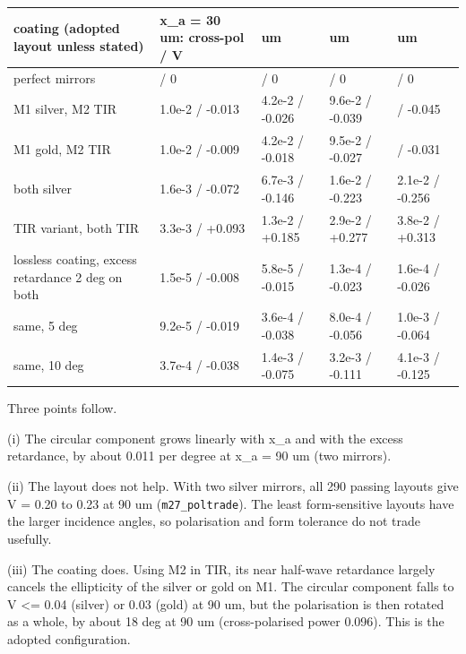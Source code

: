 {\small
\begin{longtable}[]{@{}>{\raggedright\arraybackslash}p{0.395\dimexpr(\linewidth-10\tabcolsep)\relax}>{\raggedright\arraybackslash}p{0.218\dimexpr(\linewidth-10\tabcolsep)\relax}>{\raggedright\arraybackslash}p{0.129\dimexpr(\linewidth-10\tabcolsep)\relax}>{\raggedright\arraybackslash}p{0.129\dimexpr(\linewidth-10\tabcolsep)\relax}>{\raggedright\arraybackslash}p{0.129\dimexpr(\linewidth-10\tabcolsep)\relax}@{}}
\toprule\noalign{}
coating (adopted layout unless stated) & x\_a = 30 um: cross-pol / V &
60 um & 90 um & 102 um \\
\midrule\noalign{}
\endhead
\bottomrule\noalign{}
\endlastfoot
perfect mirrors & 0 / 0 & 0 / 0 & 0 / 0 & 0 / 0 \\
M1 silver, M2 TIR & 1.0e-2 / -0.013 & 4.2e-2 / -0.026 & 9.6e-2 / -0.039
& 0.12 / -0.045 \\
M1 gold, M2 TIR & 1.0e-2 / -0.009 & 4.2e-2 / -0.018 & 9.5e-2 / -0.027 &
0.12 / -0.031 \\
both silver & 1.6e-3 / -0.072 & 6.7e-3 / -0.146 & 1.6e-2 / -0.223 &
2.1e-2 / -0.256 \\
TIR variant, both TIR & 3.3e-3 / +0.093 & 1.3e-2 / +0.185 & 2.9e-2 /
+0.277 & 3.8e-2 / +0.313 \\
lossless coating, excess retardance 2 deg on both & 1.5e-5 / -0.008 &
5.8e-5 / -0.015 & 1.3e-4 / -0.023 & 1.6e-4 / -0.026 \\
same, 5 deg & 9.2e-5 / -0.019 & 3.6e-4 / -0.038 & 8.0e-4 / -0.056 &
1.0e-3 / -0.064 \\
same, 10 deg & 3.7e-4 / -0.038 & 1.4e-3 / -0.075 & 3.2e-3 / -0.111 &
4.1e-3 / -0.125 \\
\end{longtable}
}

Three points follow.

(i) The circular component grows linearly with x\_a and with the excess
retardance, by about 0.011 per degree at x\_a = 90 um (two mirrors).

(ii) The layout does not help. With two silver mirrors, all 290 passing
layouts give \textbar V\textbar{} = 0.20 to 0.23 at 90 um
(\texttt{m27\_poltrade}). The least form-sensitive layouts have the
larger incidence angles, so polarisation and form tolerance do not trade
usefully.

(iii) The coating does. Using M2 in TIR, its near half-wave retardance
largely cancels the ellipticity of the silver or gold on M1. The
circular component falls to \textbar V\textbar{} \textless= 0.04
(silver) or 0.03 (gold) at 90 um, but the polarisation is then rotated
as a whole, by about 18 deg at 90 um (cross-polarised power 0.096). This
is the adopted configuration.


